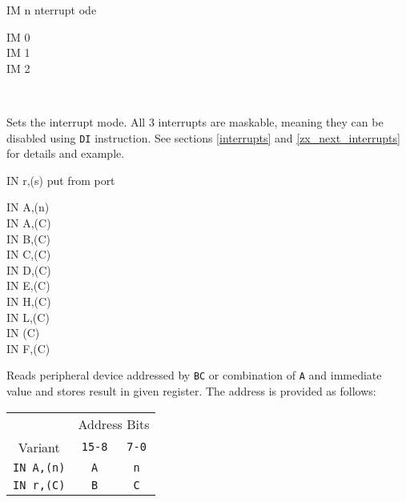 \begin{basedescript}{
	\desclabelstyle{\multilinelabel}
	\desclabelwidth{3cm}}
	\begin{DetailItem}{IM n}
		{nterrupt ode}
		{}

		\begin{DetailVariants}[2]
			IM 0\\
			IM 1\\
			IM 2
			
			\columnbreak
			~
		\end{DetailVariants}

		Sets the interrupt mode. All 3 interrupts are maskable, meaning they can be disabled using {\tt DI} instruction. See sections \ref{interrupts} and \ref{zx_next_interrupts} for details and example.

		\begin{DetailEffects}
			\FlagsIM		
		\end{DetailEffects}

		\begin{DetailTiming}
		\end{DetailTiming}

	\end{DetailItem}

	\pagebreak
	\begin{DetailItem}{IN r,(s)}
		{put from port}
		{}

		\begin{DetailVariants}
			IN A,(n)\\
			IN A,(C)\\
			IN B,(C)\\
			IN C,(C)\\
			IN D,(C)\\
			IN E,(C)\\
			IN H,(C)\\
			IN L,(C)\\
			IN (C)\UNDOC\\
			IN F,(C)\UNDOC
		\end{DetailVariants}

		Reads peripheral device addressed by {\tt BC} or combination of {\tt A} and immediate value and stores result in given register. The address is provided as follows:

		\begin{tabular}{ccc}
			& \multicolumn{2}{c}{Address Bits} \\
			Variant & {\tt 15-8} & {\tt 7-0} \\
			\hline
			{\tt IN A,(n)} & {\tt A} & {\tt n} \\
			{\tt IN r,(C)} & {\tt B} & {\tt C} \\
		\end{tabular}
		\vspace{1ex} %


\end{DetailItem}
\end{basedescript}
